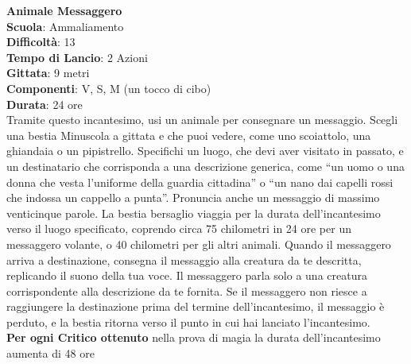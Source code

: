 \begin{multicols}{2}
\medskip\textbf{Animale Messaggero}\\
\textbf{Scuola}: Ammaliamento\\
\textbf{Difficoltà}:  13\\
\textbf{Tempo di Lancio}: 2 Azioni\\
\textbf{Gittata}: 9 metri\\
\textbf{Componenti}: V, S, M (un tocco di cibo)\\
\textbf{Durata}: 24 ore\\
Tramite questo incantesimo, usi un animale per consegnare un messaggio. Scegli una bestia Minuscola a gittata e che puoi vedere, come uno scoiattolo, una ghiandaia o un pipistrello. Specifichi un luogo, che devi aver visitato in passato, e un destinatario che corrisponda a una descrizione generica, come “un uomo o una donna che vesta l’uniforme della guardia cittadina” o “un nano dai capelli rossi che indossa un cappello a punta”. Pronuncia anche un messaggio di massimo venticinque parole. La bestia bersaglio viaggia per la durata dell'incantesimo verso il luogo specificato, coprendo circa 75 chilometri in 24 ore per un messaggero volante, o 40 chilometri per gli altri animali. Quando il messaggero arriva a destinazione, consegna il messaggio alla creatura da te descritta, replicando il suono della tua voce. Il messaggero parla solo a una creatura corrispondente alla descrizione da te fornita. Se il messaggero non riesce a raggiungere la destinazione prima del termine dell'incantesimo, il messaggio è perduto, e la bestia ritorna verso il punto in cui hai lanciato l'incantesimo.\\
\textbf{Per ogni Critico ottenuto} nella prova di magia la durata dell'incantesimo aumenta di 48 ore


\end{multicols}
